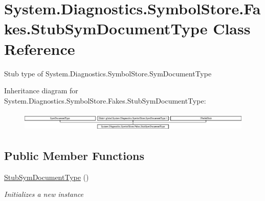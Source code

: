 \hypertarget{class_system_1_1_diagnostics_1_1_symbol_store_1_1_fakes_1_1_stub_sym_document_type}{\section{System.\-Diagnostics.\-Symbol\-Store.\-Fakes.\-Stub\-Sym\-Document\-Type Class Reference}
\label{class_system_1_1_diagnostics_1_1_symbol_store_1_1_fakes_1_1_stub_sym_document_type}
}


Stub type of System.\-Diagnostics.\-Symbol\-Store.\-Sym\-Document\-Type 


Inheritance diagram for System.\-Diagnostics.\-Symbol\-Store.\-Fakes.\-Stub\-Sym\-Document\-Type\-:\begin{figure}[H]
\begin{center}
\leavevmode
\includegraphics[height=0.919540cm]{class_system_1_1_diagnostics_1_1_symbol_store_1_1_fakes_1_1_stub_sym_document_type}
\end{center}
\end{figure}
\subsection*{Public Member Functions}
\begin{DoxyCompactItemize}
\item 
\hyperlink{class_system_1_1_diagnostics_1_1_symbol_store_1_1_fakes_1_1_stub_sym_document_type_a7a9fdb80738d535d61662ea803a3a1ad}{Stub\-Sym\-Document\-Type} ()
\begin{DoxyCompactList}\small\item\em Initializes a new instance\end{DoxyCompactList}\end{DoxyCompactItemize}
